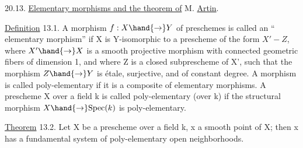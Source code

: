 
20.13. \uline{Elementary morphisms and the theorem of} M. \uline{Artin}.

\uline{Definition} 13.1. A morphism $f:X\hand{\to} Y$ of preschemes is called an “
elementary morphism” if X is  Y-isomorphic to a prescheme of the form
$X' - Z$, where $X'\hand{\to} X$ is a smooth projective morphism with connected geometric
fibers of dimension 1, and where Z is a closed subprescheme
of X',  such that the morphism $Z\hand{\to} Y$ is étale, surjective, and
of constant degree. A morphism is called  poly-elementary
if it is a composite of elementary morphisms. A prescheme X
over a field k is called poly-elementary (over k) if the structural
morphism $X\hand{\to} \mathrm{Spec}(k)$ is poly-elementary.

\uline{Theorem} 13.2.  Let X be a  prescheme over a  field k, x a smooth point
of X; then x has a fundamental system of poly-elementary open
neighborhoods.

